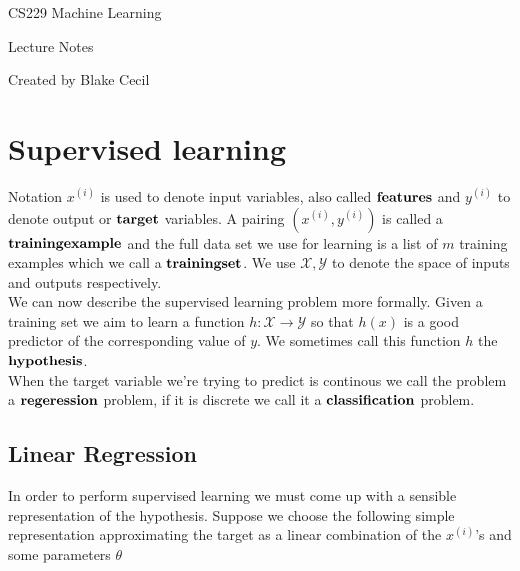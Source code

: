 \documentclass[11pt]{exam}
\newcommand{\idx}[2]{#1^{(#2)}}
\begin{document}
 

\vspace*{20mm}
 
\begin{center}
\Huge{CS229 Machine Learning}\\

\vspace{10mm}

\Huge{Lecture Notes}\\

\vspace{10mm}

\large{Created by Blake Cecil}\\

\end{center}



\newpage 

\section{Supervised learning}

Notation $x^{(i)}$ is used to denote input variables, also called $\bf{features}$ and $y^{(i)}$ to denote output or $\bf{target}$ variables. A pairing $(x^{(i)},y^{(i)})$ is called a $\bf{training example}$ and the full data set we use for learning is a list of $m$ training examples which we call a $\bf{training set}$. We use $\mathcal{X},\mathcal{Y}$ to denote the space of inputs and outputs respectively. \\

We can now describe the supervised learning problem more formally. Given a training set we aim to learn a function $h : \mathcal{X} \rightarrow \mathcal{Y}$ so that $h(x)$ is a good predictor of the corresponding value of $y$. We sometimes call this function $h$ the $\bf{hypothesis}$. \\

When the target variable we're trying to predict is continous we call the problem a $\bf{regeression}$ problem, if it is discrete we call it a $\bf{classification}$ problem.\\

\subsection{Linear Regression}
In order to perform supervised learning we must come up with a sensible representation of the hypothesis. Suppose we choose the following simple representation approximating the target as a linear combination of the $\idx{x}{i}$'s and some parameters $\theta$
\end{document}
